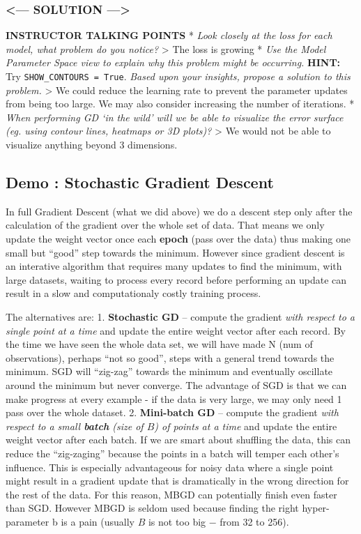\documentclass[11pt]{article}
\begin{document}
    \hypertarget{solution}{%
\subsubsection{\textless{}--- SOLUTION
---\textgreater{}}\label{solution}}

\textbf{INSTRUCTOR TALKING POINTS} * \emph{Look closely at the loss for
each model, what problem do you notice?} \textgreater{} The loss is
growing * \emph{Use the Model Parameter Space view to explain why this
problem might be occurring.} \textbf{HINT:} Try
\texttt{SHOW\_CONTOURS\ =\ True}. \emph{Based upon your insights,
propose a solution to this problem.} \textgreater{} We could reduce the
learning rate to prevent the parameter updates from being too large. We
may also consider increasing the number of iterations. * \emph{When
performing GD `in the wild' will we be able to visualize the error
surface (eg. using contour lines, heatmaps or 3D plots)?} \textgreater{}
We would not be able to visualize anything beyond 3 dimensions.

    \hypertarget{demo-stochastic-gradient-descent}{%
\subsection{Demo : Stochastic Gradient
Descent}\label{demo-stochastic-gradient-descent}}

In full Gradient Descent (what we did above) we do a descent step only
after the calculation of the gradient over the whole set of data. That
means we only update the weight vector once each \textbf{epoch} (pass
over the data) thus making one small but ``good'' step towards the
minimum. However since gradient descent is an interative algorithm that
requires many updates to find the minimum, with large datasets, waiting
to process every record before performing an update can result in a slow
and computationaly costly training process.

The alternatives are: 1. \textbf{Stochastic GD} -- compute the gradient
\emph{with respect to a single point at a time} and update the entire
weight vector after each record. By the time we have seen the whole data
set, we will have made N (num of observations), perhaps ``not so good'',
steps with a general trend towards the minimum. SGD will ``zig-zag''
towards the minimum and eventually oscillate around the minimum but
never converge. The advantage of SGD is that we can make progress at
every example - if the data is very large, we may only need 1 pass over
the whole dataset. 2. \textbf{Mini-batch GD} -- compute the gradient
\emph{with respect to a small \textbf{batch} (size of \(B\)) of points
at a time} and update the entire weight vector after each batch. If we
are smart about shuffling the data, this can reduce the ``zig-zaging''
because the points in a batch will temper each other's influence. This
is especially advantageous for noisy data where a single point might
result in a gradient update that is dramatically in the wrong direction
for the rest of the data. For this reason, MBGD can potentially finish
even faster than SGD. However MBGD is seldom used because finding the
right hyper-parameter b is a pain (usually \(B\) is not too big \(-\)
from 32 to 256).
\end{document}
